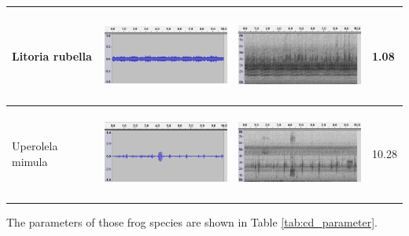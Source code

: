 \begin{table}[htb!]
{\begin{tabular}{llll}
Litoria rubella             &    \begin{minipage}{.3\textwidth} \includegraphics[width=45mm, height=30mm]{image/rubella_jcu_wav.png}  \end{minipage}      &   \begin{minipage}{.3\textwidth} \includegraphics[width=45mm, height=30mm]{image/rubella_jcu_spec.png}  \end{minipage}          & 1.08     \\ \hline
Uperolela mimula            &   \begin{minipage}{.3\textwidth} \includegraphics[width=45mm, height=30mm]{image/mimula_jcu_wav.png}  \end{minipage}       &  \begin{minipage}{.3\textwidth} \includegraphics[width=45mm, height=30mm]{image/mimula_jcu_spec.png}  \end{minipage}           & 10.28    \\ \hline\hline
\end{tabular}
}
\end{table}


\noindent The parameters of those frog species are shown in Table \ref{tab:cd_parameter}.



